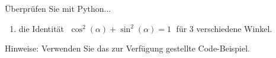 \begin{ExerciseBlock}
Überprüfen Sie mit Python...
\begin{enumerate}[label=\alph*)]
	\item die Identität $\; \displaystyle \cos^2(\alpha) + \sin^2(\alpha) = 1 \;$ für 3 verschiedene Winkel.

\end{enumerate}
Hinweise: Verwenden Sie das zur Verfügung gestellte Code-Beispiel.
\end{ExerciseBlock}
